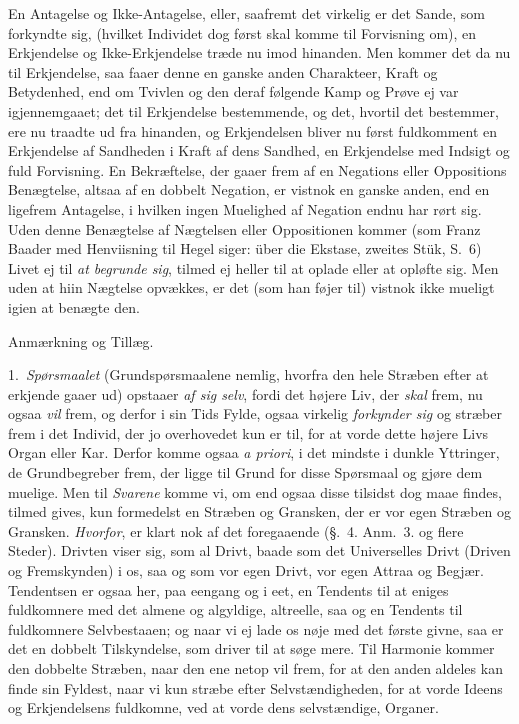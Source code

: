 \documentclass[12pt,a4paper]{book}
\newcommand{\apage}[1]{\marginnote{\footnotesize\textit{[#1]}}}
\begin{document}
En Antagelse og Ikke-Antagelse, eller, saafremt det virkelig er det Sande,
som forkyndte sig, (hvilket Individet dog først skal komme til Forvisning om), en
Erkjendelse og Ikke-Erkjendelse træde nu imod hinanden. Men kommer det da
nu til Erkjendelse, saa faaer denne en ganske \apage{163}  anden Charakteer, Kraft og
Betydenhed, end om Tvivlen og den deraf følgende Kamp og Prøve ej var
igjennemgaaet; det til Erkjendelse bestemmende, og det, hvortil det bestemmer,
ere nu traadte ud fra hinanden, og Erkjendelsen bliver nu først fuldkomment en
Erkjendelse af Sandheden i Kraft af dens Sandhed, en Erkjendelse med Indsigt og
fuld Forvisning. En Bekræftelse, der gaaer frem af en Negations eller Oppositions
Benægtelse, altsaa af en dobbelt Negation, er vistnok en ganske anden, end en
ligefrem Antagelse, i hvilken ingen Muelighed af Negation endnu har rørt sig. Uden
denne Benægtelse af Nægtelsen eller Oppositionen kommer (som Franz Baader med
Henviisning til Hegel siger: über die Ekstase, zweites Stük, S.~6) Livet ej til
\emph{at begrunde sig}, tilmed ej heller til at oplade eller at opløfte sig. Men
uden at hiin Nægtelse opvækkes, er det (som han føjer til) vistnok ikke mueligt
igien at benægte den.

\begin{center}Anmærkning og Tillæg.\end{center}

1.~\emph{Spørsmaalet} (Grundspørsmaalene nemlig, hvorfra den hele Stræben efter at
erkjende gaaer ud) opstaaer \emph{af sig selv}, fordi det højere Liv, der \emph{skal}
frem, nu ogsaa \emph{vil} frem, og derfor i sin Tids Fylde, ogsaa virkelig \emph{forkynder sig}
og stræber frem i det Individ, der \apage{164} jo overhovedet kun er til, for at vorde dette
højere Livs Organ eller Kar. Derfor komme ogsaa \emph{a priori}, i det mindste i
dunkle Yttringer, de Grundbegreber frem, der ligge til Grund for disse Spørsmaal
og gjøre dem muelige. Men til \emph{Svarene} komme vi, om end ogsaa disse tilsidst
dog maae findes, tilmed gives, kun formedelst en Stræben og Gransken, der er vor
egen Stræben og Gransken. \emph{Hvorfor}, er klart nok af det foregaaende (§.~4. Anm.~3.
og flere Steder). Drivten viser sig, som al Drivt, baade som det Universelles
Drivt (Driven og Fremskynden) i os, saa og som vor egen Drivt, vor egen Attraa og
Begjær. Tendentsen er ogsaa her, paa eengang og i eet, en Tendents til at eniges
fuldkomnere med det almene og algyldige, altreelle, saa og en Tendents til
fuldkomnere Selvbestaaen; og naar vi ej lade os nøje med det første givne, saa er
det en dobbelt Tilskyndelse, som driver til at søge mere. Til Harmonie kommer den
dobbelte Stræben, naar den ene netop vil frem, for at den anden aldeles kan finde
sin Fyldest, naar vi kun stræbe efter Selvstændigheden, for at vorde Ideens og
Erkjendelsens fuldkomne, ved at vorde dens selvstændige, Organer.
\end{document}

